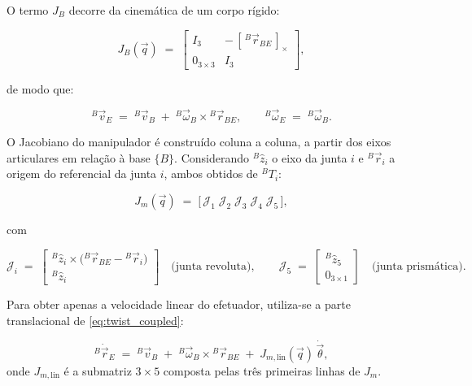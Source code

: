 O termo $J_B$ decorre da cinemática de um corpo rígido:

\begin{equation}
\label{eq:JB}
J_B(\vec q)
\;=\;
\begin{bmatrix}
I_{3} & -\,[\,{}^{B}\vec r_{BE}\,]_{\times} \\
0_{3\times 3} & I_{3}
\end{bmatrix},
\end{equation}

de modo que:

\begin{equation}
\label{eq:vE_from_vB}
{}^{B}\vec v_E \;=\; {}^{B}\vec v_B \;+\; {}^{B}\vec \omega_B \times {}^{B}\vec r_{BE},
\qquad
{}^{B}\vec \omega_E \;=\; {}^{B}\vec \omega_B.
\end{equation}

O Jacobiano do manipulador é construído coluna a coluna, a partir dos eixos articulares em relação à base $\{B\}$.
Considerando ${}^{B}\hat z_i$ o eixo da junta $i$ e ${}^{B}\vec r_i$ a origem do referencial da junta $i$, ambos obtidos de ${}^{B}T_i$:

\begin{equation}
\label{eq:Jm_colunas}
J_m(\vec q) \;=\; \big[\, \mathcal{J}_1 \;\mathcal{J}_2 \;\mathcal{J}_3 \;\mathcal{J}_4 \;\mathcal{J}_5 \,\big],
\end{equation}

com

\begin{equation}
\label{eq:Jm_rev}
\mathcal{J}_i \;=\;
\begin{bmatrix}
{}^{B}\hat z_i \times \big({}^{B}\vec r_{BE} - {}^{B}\vec r_i\big) \\
{}^{B}\hat z_i
\end{bmatrix}
\quad \text{(junta revoluta)},
\qquad
\mathcal{J}_5 \;=\;
\begin{bmatrix}
{}^{B}\hat z_5 \\
0_{3\times 1}
\end{bmatrix}
\quad \text{(junta prismática)}.
\end{equation}

Para obter apenas a velocidade linear do efetuador, utiliza-se a parte translacional de \eqref{eq:twist_coupled}:

\begin{equation}
\label{eq:linear_relation}
{}^{B}\dot{\vec r}_{E}
\;=\;
{}^{B}\vec v_B
\;+\;
{}^{B}\vec \omega_B \times {}^{B}\vec r_{BE}
\;+\;
J_{m,\text{lin}}(\vec q)\,\dot{\vec\theta},
\end{equation}
onde $J_{m,\text{lin}}$ é a submatriz $3\times 5$ composta pelas três primeiras linhas de $J_m$.

